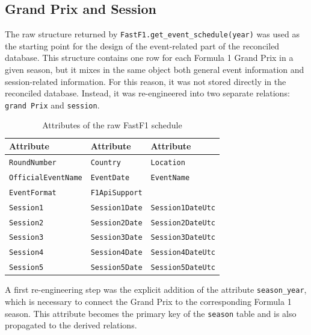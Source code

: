 \documentclass[12pt,a4paper]{article}
\begin{document}
	
	\subsection{Grand Prix and Session}
	
	The raw structure returned by \texttt{FastF1.get\_event\_schedule(year)} was used as the starting point for the design of the event-related part of the reconciled database.
	This structure contains one row for each Formula 1 Grand Prix in a given season, but it mixes in the same object both general event information and session-related information.
	For this reason, it was not stored directly in the reconciled database.
	Instead, it was re-engineered into two separate relations: \texttt{grand Prix} and \texttt{session}.
	
	\begin{table}[H]
		\centering
		\caption{Attributes of the raw FastF1 schedule}
		\renewcommand{\arraystretch}{1.15}
		\begin{tabularx}{\textwidth}{>{\raggedright\arraybackslash}X >{\raggedright\arraybackslash}X >{\raggedright\arraybackslash}X}
			\toprule
			\textbf{Attribute} & \textbf{Attribute} & \textbf{Attribute} \\
			\midrule
			\texttt{RoundNumber} & \texttt{Country} & \texttt{Location} \\
			\texttt{OfficialEventName} & \texttt{EventDate} & \texttt{EventName} \\
			\texttt{EventFormat} & \texttt{F1ApiSupport} & \\
			\texttt{Session1} & \texttt{Session1Date} & \texttt{Session1DateUtc} \\
			\texttt{Session2} & \texttt{Session2Date} & \texttt{Session2DateUtc} \\
			\texttt{Session3} & \texttt{Session3Date} & \texttt{Session3DateUtc} \\
			\texttt{Session4} & \texttt{Session4Date} & \texttt{Session4DateUtc} \\
			\texttt{Session5} & \texttt{Session5Date} & \texttt{Session5DateUtc} \\
			\bottomrule
		\end{tabularx}
	\end{table}
	
	A first re-engineering step was the explicit addition of the attribute \texttt{season\_year}, which is necessary to connect the Grand Prix to the corresponding Formula 1 season.
	This attribute becomes the primary key of the \texttt{season} table and is also propagated to the derived relations.
	
\end{document}
